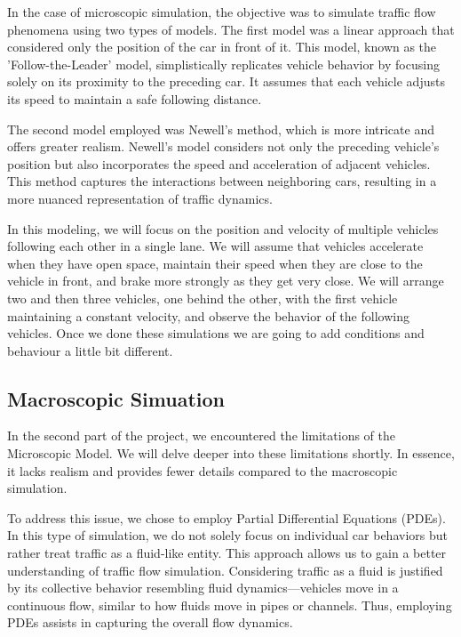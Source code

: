 \documentclass{article}
\begin{document}
	
	In the case of microscopic simulation, the objective was to simulate traffic flow phenomena using two types of models.
	The first model was a linear approach that considered only the position of the car in front of it. This model, known as the 'Follow-the-Leader' model, simplistically replicates vehicle behavior by focusing solely on its proximity to the preceding car. It assumes that each vehicle adjusts its speed to maintain a safe following distance.
	
	The second model employed was Newell's method, which is more intricate and offers greater realism. Newell's model considers not only the preceding vehicle's position but also incorporates the speed and acceleration of adjacent vehicles. This method captures the interactions between neighboring cars, resulting in a more nuanced representation of traffic dynamics.
	
	In this modeling, we will focus on the position and velocity of multiple vehicles following each other in a single lane. We will assume that vehicles accelerate when they have open space, maintain their speed when they are close to the vehicle in front, and brake more strongly as they get very close. We will arrange two and then three vehicles, one behind the other, with the first vehicle maintaining a constant velocity, and observe the behavior of the following vehicles.
	Once we done these simulations we are going to add conditions and behaviour a little bit different.
	
	\subsection{Macroscopic Simuation}
	
	In the second part of the project, we encountered the limitations of the Microscopic Model. We will delve deeper into these limitations shortly. In essence, it lacks realism and provides fewer details compared to the macroscopic simulation.
	
	To address this issue, we chose to employ Partial Differential Equations (PDEs). In this type of simulation, we do not solely focus on individual car behaviors but rather treat traffic as a fluid-like entity. This approach allows us to gain a better understanding of traffic flow simulation. Considering traffic as a fluid is justified by its collective behavior resembling fluid dynamics—vehicles move in a continuous flow, similar to how fluids move in pipes or channels. Thus, employing PDEs assists in capturing the overall flow dynamics.
	
\end{document}
